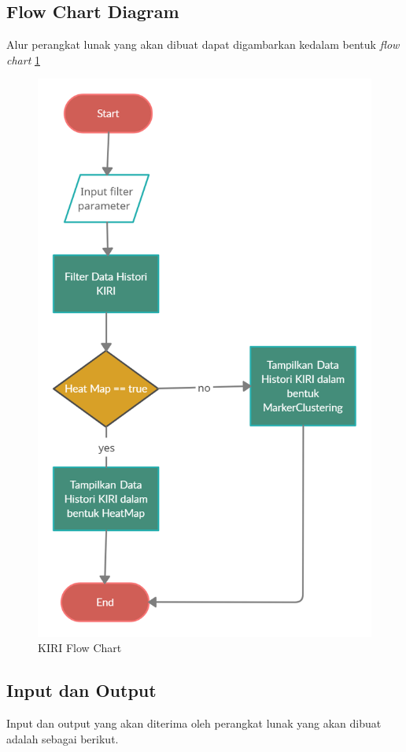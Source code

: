 \subsection{Flow Chart Diagram}
Alur perangkat lunak yang akan dibuat dapat digambarkan kedalam bentuk \textit{flow chart}  \ref{fig:fc}
\begin{figure}[H]
	\centering  
	\includegraphics[scale=0.3]{Gambar/KIRI_Flow_Chart.png}  
	\caption[KIRI Flow Chart]{KIRI Flow Chart} 
	\label{fig:fc} 
\end{figure} 


\subsection{Input dan Output}
Input dan output yang akan diterima oleh perangkat lunak yang akan dibuat adalah sebagai berikut.

